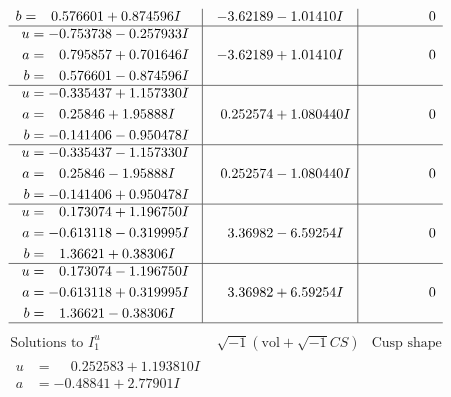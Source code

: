 \documentclass[1p]{elsarticle_modified}
\theoremstyle{definition}
\newcommand{\I}{\sqrt{-1}}
\begin{document}
$$\begin{array}{c|c|c}
\begin{aligned}
b &= \phantom{-}0.576601 + 0.874596 I\end{aligned}
 & -3.62189 - 1.01410 I & \phantom{-0.000000 } 0 \\ \hline\begin{aligned}
u &= -0.753738 - 0.257933 I \\
a &= \phantom{-}0.795857 + 0.701646 I \\
b &= \phantom{-}0.576601 - 0.874596 I\end{aligned}
 & -3.62189 + 1.01410 I & \phantom{-0.000000 } 0 \\ \hline\begin{aligned}
u &= -0.335437 + 1.157330 I \\
a &= \phantom{-}0.25846 + 1.95888 I \\
b &= -0.141406 - 0.950478 I\end{aligned}
 & \phantom{-}0.252574 + 1.080440 I & \phantom{-0.000000 } 0 \\ \hline\begin{aligned}
u &= -0.335437 - 1.157330 I \\
a &= \phantom{-}0.25846 - 1.95888 I \\
b &= -0.141406 + 0.950478 I\end{aligned}
 & \phantom{-}0.252574 - 1.080440 I & \phantom{-0.000000 } 0 \\ \hline\begin{aligned}
u &= \phantom{-}0.173074 + 1.196750 I \\
a &= -0.613118 - 0.319995 I \\
b &= \phantom{-}1.36621 + 0.38306 I\end{aligned}
 & \phantom{-}3.36982 - 6.59254 I & \phantom{-0.000000 } 0 \\ \hline\begin{aligned}
u &= \phantom{-}0.173074 - 1.196750 I \\
a &= -0.613118 + 0.319995 I \\
b &= \phantom{-}1.36621 - 0.38306 I\end{aligned}
 & \phantom{-}3.36982 + 6.59254 I & \phantom{-0.000000 } 0\\
 \hline 
 \end{array}$$\newpage$$\begin{array}{c|c|c}  
\text{Solutions to }I^u_{1}& \I (\text{vol} + \sqrt{-1}CS) & \text{Cusp shape}\\
 \hline 
\begin{aligned}
u &= \phantom{-}0.252583 + 1.193810 I \\
a &= -0.48841 + 2.77901 I \\

\end{aligned}
\end{array}$$
\end{document}
